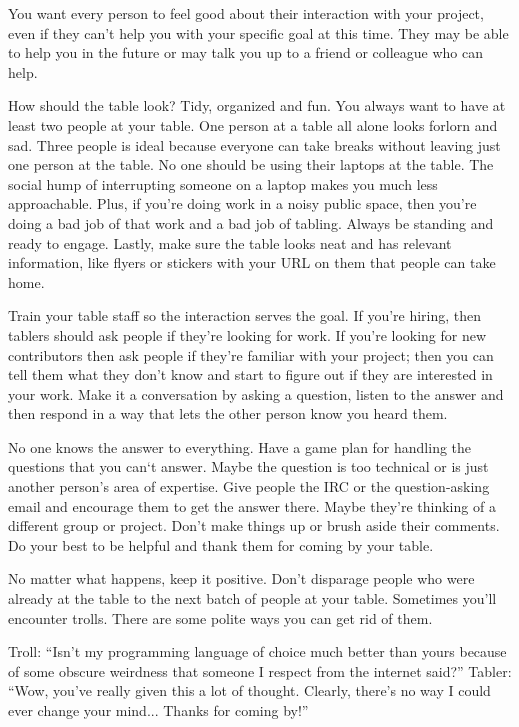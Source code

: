 You want every person to feel good about their interaction with your project, even if they can't help you with your specific goal at this time. They may be able to help you in the future or may talk you up to a friend or colleague who can help. 

How should the table look? Tidy, organized and fun. You always want to have at least two people at your table. One person at a table all alone looks forlorn and sad. Three people is ideal because everyone can take breaks without leaving just one person at the table. No one should be using their laptops at the table. The social hump of interrupting someone on a laptop makes you much less approachable. Plus, if you’re doing work in a noisy public space, then you’re doing a bad job of that work and a bad job of tabling. Always be standing and ready to engage. Lastly, make sure the table looks neat and has relevant information, like flyers or stickers with your URL on them that people can take home. 

Train your table staff so the interaction serves the goal. If you’re hiring, then tablers should ask people if they’re looking for work. If you’re looking for new contributors then ask people if they’re familiar with your project; then you can tell them what they don’t know and start to figure out if they are interested in your work. Make it a conversation by asking a question, listen to the answer and then respond in a way that lets the other person know you heard them. 

No one knows the answer to everything. Have a game plan for handling the questions that you can‘t answer. Maybe the question is too technical or is just another person’s area of expertise. Give people the IRC or the question-asking email and encourage them to get the answer there. Maybe they’re thinking of a different group or project. Don’t make things up or brush aside their comments. Do your best to be helpful and thank them for coming by your table. 

No matter what happens, keep it positive. Don't disparage people who were already at the table to the next batch of people at your table. Sometimes you'll encounter trolls. There are some polite ways you can get rid of them. 

Troll: “Isn’t my programming language of choice much better than yours because of some obscure weirdness that someone I respect from the internet said?”
Tabler: “Wow, you've really given this a lot of thought. Clearly, there's no way I could ever change your mind... Thanks for coming by!”

